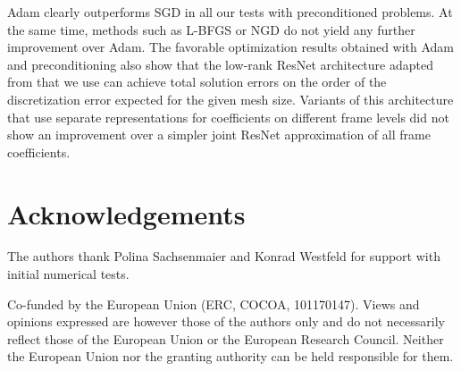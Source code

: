 \documentclass[a4paper,11pt]{amsart}
\numberwithin{equation}{section}
\theoremstyle{definition}
\theoremstyle{remark}
\theoremstyle{plain}
\begin{document}
Adam clearly outperforms SGD in all our tests with preconditioned problems. At the same time, methods such as L-BFGS or NGD do not yield any further improvement over Adam. The favorable optimization results obtained with Adam and preconditioning also show that the low-rank ResNet architecture adapted from \cite{BachmayrDahmenOster2024} that we use can achieve total solution errors on the order of the discretization error expected for the given mesh size. Variants of this architecture that use separate representations for coefficients on different frame levels did not show an improvement over a simpler joint ResNet approximation of all frame coefficients.

\section*{Acknowledgements}

The authors thank Polina Sachsenmaier and Konrad Westfeld for support with initial numerical tests.

Co-funded by the European Union (ERC, COCOA, 101170147). Views and opinions expressed are however those of the authors only and do not necessarily reflect those of the European Union or the European Research Council. Neither the European Union nor the granting authority can be held responsible for them.





\end{document}

